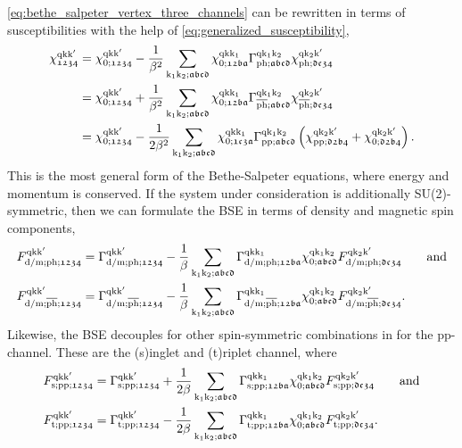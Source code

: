 \documentclass[../../main.tex]{subfiles}
\begin{document}
\eqref{eq:bethe_salpeter_vertex_three_channels} can be rewritten in terms of susceptibilities with the help of \eqref{eq:generalized_susceptibility},
\begin{subequations}\label{eq:bethe_salpeter_susc}
\begin{align}
	\chi^{\text{q}\text{k}\text{k}'}_{\mathfrak{1234}}&=\chi^{\text{q}\text{k}\text{k}'}_{0;\mathfrak{1234}}-\frac{1}{\beta^2}\sum_{\text{k}_1\text{k}_2;\mathfrak{abcd}}\chi^{\text{q}\text{k}\text{k}_1}_{0;\mathfrak{12ba}} \Gamma^{\text{q}\text{k}_1\text{k}_2}_{\text{ph};\mathfrak{abcd}} \chi^{\text{q}\text{k}_2\text{k}'}_{\text{ph};\mathfrak{dc34}}\\
	&=\chi^{\text{q}\text{k}\text{k}'}_{0;\mathfrak{1234}}+\frac{1}{\beta^2}\sum_{\text{k}_1\text{k}_2;\mathfrak{abcd}}\chi^{\text{q}\text{k}\text{k}_1}_{0;\mathfrak{12ba}} \Gamma^{\text{q}\text{k}_1\text{k}_2}_{\overline{\text{ph}};\mathfrak{abcd}} \chi^{\text{q}\text{k}_2\text{k}'}_{\overline{\text{ph}};\mathfrak{dc34}}\\
	&=\chi^{\text{q}\text{k}\text{k}'}_{0;\mathfrak{1234}}-\frac{1}{2\beta^2}\sum_{\text{k}_1\text{k}_2;\mathfrak{abcd}}\chi^{\text{q}\text{k}\text{k}_1}_{0;\mathfrak{1c3a}}\Gamma^{\text{q}\text{k}_1\text{k}_2}_{\text{pp};\mathfrak{abcd}}\left (\chi^{\text{q}\text{k}_2\text{k}'}_{\text{pp};\mathfrak{d2b4}}+\chi^{\text{q}\text{k}_2\text{k}'}_{0;\mathfrak{d2b4}}\right ).
\end{align}
\end{subequations}
This is the most general form of the Bethe-Salpeter equations, where energy and momentum is conserved. If the system under consideration is additionally SU(2)-symmetric, then we can formulate the BSE in terms of density and magnetic spin components,
\begin{subequations}
\begin{align}
	F_{\text{d}/\text{m};\text{ph};\mathfrak{1234}}^{\text{q}\text{k}\text{k}'}&=\Gamma_{\text{d}/\text{m};\text{ph};\mathfrak{1234}}^{\text{q}\text{k}\text{k}'}-\frac1\beta\sum_{\text{k}_1\text{k}_2;\mathfrak{abcd}} \Gamma_{\text{d}/\text{m};\text{ph};\mathfrak{12ba}}^{\text{q}\text{k}\text{k}_1} \chi_{0;\mathfrak{abcd}}^{\text{q}\text{k}_1\text{k}_2} F_{\text{d}/\text{m};\text{ph};\mathfrak{dc34}}^{\text{q}\text{k}_2\text{k}'}\qquad\text{and}\\
	F_{\text{d}/\text{m};\overline{\text{ph}};\mathfrak{1234}}^{\text{q}\text{k}\text{k}'}&=\Gamma_{\text{d}/\text{m};\overline{\text{ph}};\mathfrak{1234}}^{\text{q}\text{k}\text{k}'}-\frac1\beta\sum_{\text{k}_1\text{k}_2;\mathfrak{abcd}} \Gamma_{\text{d}/\text{m};\overline{\text{ph}};\mathfrak{12ba}}^{\text{q}\text{k}\text{k}_1} \chi_{0;\mathfrak{abcd}}^{\text{q}\text{k}_1\text{k}_2} F_{\text{d}/\text{m};\overline{\text{ph}};\mathfrak{dc34}}^{\text{q}\text{k}_2\text{k}'}.
\end{align}
\end{subequations}
Likewise, the BSE decouples for other spin-symmetric combinations in for the pp-channel. These are the (s)inglet and (t)riplet channel, where
\begin{align}
	F_{\text{s};\text{pp};\mathfrak{1234}}^{\text{q}\text{k}\text{k}'}&=\Gamma_{\text{s};\text{pp};\mathfrak{1234}}^{\text{q}\text{k}\text{k}'}+\frac{1}{2\beta}\sum_{\text{k}_1\text{k}_2;\mathfrak{abcd}} \Gamma_{\text{s};\text{pp};\mathfrak{12ba}}^{\text{q}\text{k}\text{k}_1} \chi_{0;\mathfrak{abcd}}^{\text{q}\text{k}_1\text{k}_2} F_{\text{s};\text{pp};\mathfrak{dc34}}^{\text{q}\text{k}_2\text{k}'}\qquad\text{and}\\
	F_{\text{t};\text{pp};\mathfrak{1234}}^{\text{q}\text{k}\text{k}'}&=\Gamma_{\text{t};\text{pp};\mathfrak{1234}}^{\text{q}\text{k}\text{k}'}-\frac{1}{2\beta}\sum_{\text{k}_1\text{k}_2;\mathfrak{abcd}} \Gamma_{\text{t};\text{pp};\mathfrak{12ba}}^{\text{q}\text{k}\text{k}_1} \chi_{0;\mathfrak{abcd}}^{\text{q}\text{k}_1\text{k}_2} F_{\text{t};\text{pp};\mathfrak{dc34}}^{\text{q}\text{k}_2\text{k}'}.
\end{align}
\end{document}
